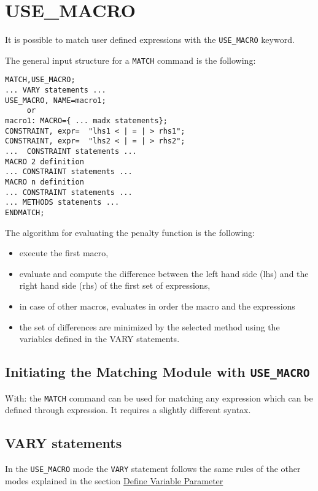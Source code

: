%

\section{USE\_MACRO}
\label{sec:use-macro}
 
It is possible to match user defined expressions with the
\texttt{USE\_MACRO} keyword. 

The general input structure for a \texttt{MATCH} command is the following:

\begin{verbatim}
MATCH,USE_MACRO;
... VARY statements ...
USE_MACRO, NAME=macro1;
     or
macro1: MACRO={ ... madx statements};
CONSTRAINT, expr=  "lhs1 < | = | > rhs1";
CONSTRAINT, expr=  "lhs2 < | = | > rhs2";
...  CONSTRAINT statements ...
MACRO 2 definition
... CONSTRAINT statements ...
MACRO n definition
... CONSTRAINT statements ...
... METHODS statements ...
ENDMATCH;
\end{verbatim}
 
The algorithm for evaluating the penalty function is the following:
 
\begin{itemize}
   \item  execute the first macro,
   \item  evaluate and compute the difference between the left hand side
     (lhs) and the right hand side (rhs) of the first set of expressions, 
   \item in case of other macros, evaluates in order the macro and the
     expressions 
   \item  the set of differences are  minimized by the selected method
     using the variables defined in the VARY statements. 
\end{itemize}

\subsection{Initiating the Matching Module with \texttt{USE\_MACRO}}
 
With:
the \texttt{MATCH} command can be used for matching any expression which
can be defined through expression. It requires a slightly different syntax.

\subsection{VARY statements}
In the \texttt{USE\_MACRO} mode the \texttt{VARY} statement follows the
same rules of the other modes explained in the section
\hyperref[sec:vary]{Define Variable Parameter} 

